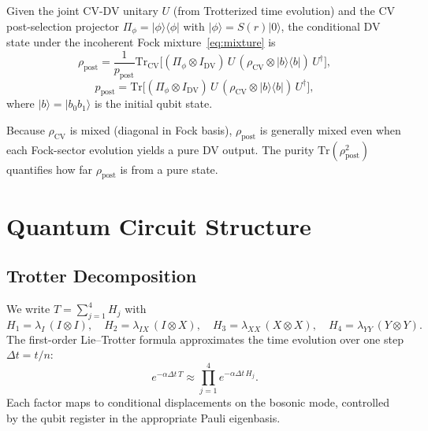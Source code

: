 \documentclass[11pt]{article}
\newcommand{\tr}{\mathrm{Tr}}
\newcommand{\ket}[1]{|{#1}\rangle}
\newcommand{\bra}[1]{\langle{#1}|}
\begin{document}
Given the joint CV-DV unitary $U$ (from Trotterized time evolution) and the
CV post-selection projector $\Pi_\phi = \ket{\phi}\!\bra{\phi}$ with
$\ket{\phi} = S(r)\ket{0}$, the conditional DV state under the incoherent
Fock mixture~\eqref{eq:mixture} is
\begin{equation}\label{eq:rho-post}
\rho_{\mathrm{post}}
= \frac{1}{p_{\mathrm{post}}}
  \tr_{\mathrm{CV}}\!\Big[
    (\Pi_\phi \otimes I_{\mathrm{DV}})\,
    U\,(\rho_{\mathrm{CV}} \otimes \ket{b}\!\bra{b})\,U^\dagger
  \Big],
\end{equation}
\begin{equation}\label{eq:ppost-formal}
p_{\mathrm{post}}
= \tr\!\Big[
    (\Pi_\phi \otimes I_{\mathrm{DV}})\,
    U\,(\rho_{\mathrm{CV}} \otimes \ket{b}\!\bra{b})\,U^\dagger
  \Big],
\end{equation}
where $\ket{b} = \ket{b_0 b_1}$ is the initial qubit state.

Because $\rho_{\mathrm{CV}}$ is mixed (diagonal in Fock basis), $\rho_{\mathrm{post}}$
is generally mixed even when each Fock-sector evolution yields a pure DV output.
The purity $\tr(\rho_{\mathrm{post}}^2)$ quantifies how far $\rho_{\mathrm{post}}$
is from a pure state.

\section{Quantum Circuit Structure}

\subsection{Trotter Decomposition}
We write $T = \sum_{j=1}^{4} H_j$ with
\begin{equation}
H_1 = \lambda_I\,(I\otimes I),\quad
H_2 = \lambda_{IX}\,(I\otimes X),\quad
H_3 = \lambda_{XX}\,(X\otimes X),\quad
H_4 = \lambda_{YY}\,(Y\otimes Y).
\end{equation}
The first-order Lie--Trotter formula approximates the time evolution over one step $\Delta t = t/n$:
\begin{equation}\label{eq:trotter}
e^{-\alpha\Delta t\,T}
\approx \prod_{j=1}^{4} e^{-\alpha\Delta t\,H_j}.
\end{equation}
Each factor maps to conditional displacements on the bosonic mode, controlled by the
qubit register in the appropriate Pauli eigenbasis.
\end{document}
